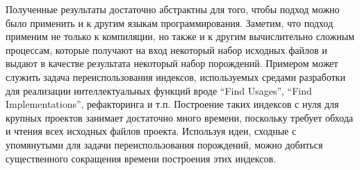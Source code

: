 Полученные результаты достаточно абстрактны для того, чтобы подход можно было применить и к другим языкам программирования. Заметим, что подход применим не только к компиляции, но также и к другим вычислительно сложным процессам, которые получают на вход некоторый набор исходных файлов и выдают в качестве результата некоторый набор порождений. Примером может служить задача переиспользования индексов, используемых средами разработки для реализации интеллектуальных функций вроде ``Find Usages'', ``Find Implementations'', рефакторинга и т.п. Построение таких индексов с нуля для крупных проектов занимает достаточно много времени, поскольку требует обхода и чтения всех исходных файлов проекта. Используя идеи, сходные с упомянутыми для задачи переиспользования порождений, можно добиться существенного сокращения времени построения этих индексов.